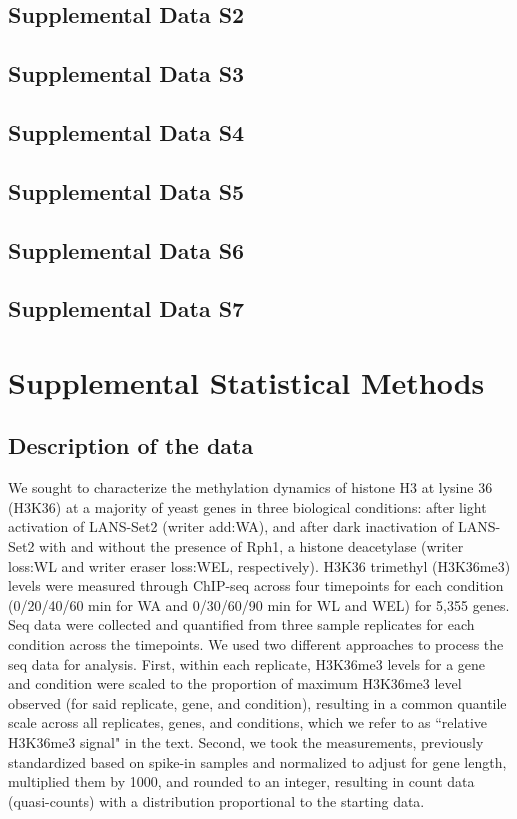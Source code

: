 \documentclass[11pt]{biorxiv}
\begin{document}
\subsection{Supplemental Data S2}
\subsection{Supplemental Data S3}
\subsection{Supplemental Data S4}
\subsection{Supplemental Data S5}
\subsection{Supplemental Data S6}
\subsection{Supplemental Data S7}


\section{Supplemental Statistical Methods}

\subsection{Description of the data}
We sought to characterize the methylation dynamics of histone H3 at lysine 36 (H3K36) at a majority of yeast genes in three biological conditions: after light activation of LANS-Set2 (writer add:WA), and after dark inactivation of LANS-Set2 with and without the presence of Rph1, a histone deacetylase (writer loss:WL and writer eraser loss:WEL, respectively). H3K36 trimethyl (H3K36me3) levels were measured through ChIP-seq across four timepoints for each condition (0/20/40/60 min for WA and 0/30/60/90 min for WL and WEL) for 5,355 genes. Seq data were collected and quantified from three sample replicates for each condition across the timepoints. We used two different approaches to process the seq data for analysis. First, within each replicate, H3K36me3 levels for a gene and condition were scaled to the proportion of maximum H3K36me3 level observed (for said replicate, gene, and condition), resulting in a common quantile scale across all replicates, genes, and conditions, which we refer to as ``relative H3K36me3 signal" in the text. Second, we took the measurements, previously standardized based on spike-in samples and normalized to adjust for gene length, multiplied them by 1000, and rounded to an integer, resulting in count data (quasi-counts) with a distribution proportional to the starting data. 
\end{document}
